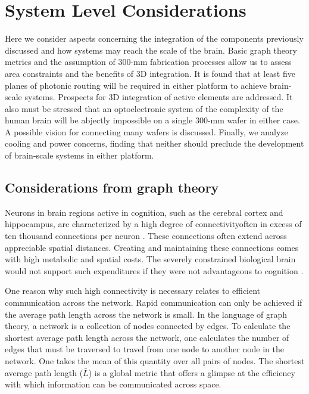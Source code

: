 \documentclass[twocolumn]{article}
\begin{document}
\section{\label{sec:instantiation}System Level Considerations}
Here we consider aspects concerning the integration of the components previously discussed and how systems may reach the scale of the brain. Basic graph theory metrics and the assumption of 300-mm fabrication processes allow us to assess area constraints and the benefits of 3D integration. It is found that at least five planes of photonic routing will be required in either platform to achieve brain-scale systems. Prospects for 3D integration of active elements are addressed. It also must be stressed that an optoelectronic system of the complexity of the human brain will be abjectly impossible on a single 300-mm wafer in either case. A possible vision for connecting many wafers is discussed. Finally, we analyze cooling and power concerns, finding that neither should preclude the development of brain-scale systems in either platform.

\subsection{Considerations from graph theory}
Neurons in brain regions active in cognition, such as the cerebral cortex and hippocampus, are characterized by a high degree of connectivity\textemdash often in excess of ten thousand connections per neuron \cite{brsc1998,bu2006}. These connections often extend across appreciable spatial distances. Creating and maintaining these connections comes with high metabolic and spatial costs. The severely constrained biological brain would not support such expenditures if they were not advantageous to cognition \cite{busp2012}.

One reason why such high connectivity is necessary relates to efficient communication across the network. Rapid communication can only be achieved if the average path length across the network is small. In the language of graph theory, a network is a collection of nodes connected by edges. To calculate the shortest average path length across the network, one calculates the number of edges that must be traversed to travel from one node to another node in the network. One takes the mean of this quantity over all pairs of nodes. The shortest average path length ($\bar{L}$) is a global metric that offers a glimpse at the efficiency with which information can be communicated across space.
\end{document}

